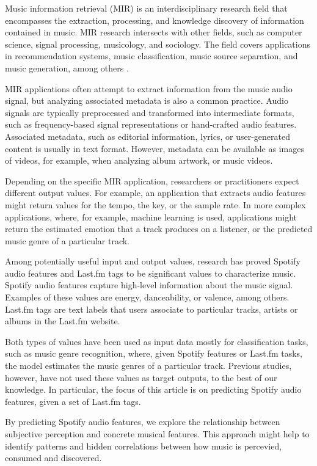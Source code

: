 \documentclass[sn-mathphys]{sn-jnl}%
\theoremstyle{thmstyleone}%
\theoremstyle{thmstyletwo}%
\theoremstyle{thmstylethree}%
\begin{document}
Music information retrieval (MIR) is an interdisciplinary research field that encompasses the extraction,
processing, and knowledge discovery of information contained in music.
MIR research intersects with other fields, such as computer science, signal processing, musicology, and sociology.
The field covers applications in recommendation systems, music classification,
music source separation, and music generation, among others \cite{ramirez2020machine}.

MIR applications often attempt to extract information from the music audio signal,
but analyzing associated metadata is also a common practice.
Audio signals are typically preprocessed and transformed into intermediate formats, such as frequency-based signal representations or hand-crafted audio features.
Associated metadata, such as editorial information, lyrics, or user-generated content is usually in text format.
However, metadata can be available as images of videos, for example, when analyzing album artwork, or music videos.

Depending on the specific MIR application, researchers or practitioners expect different output values.
For example, an application that extracts audio features might return values for the tempo, the key, or the sample rate.
In more complex applications, where, for example, machine learning is used,
applications might return the estimated emotion that a track produces on a listener, or the predicted music genre of a particular track.

Among potentially useful input and output values, research has proved Spotify audio features and Last.fm tags to be significant values to characterize music.
Spotify audio features capture high-level information about the music signal.
Examples of these values are energy, danceability, or valence, among others.
Last.fm tags are text labels that users associate to particular tracks, artists or albums in the Last.fm website.

Both types of values have been used as input data mostly for classification tasks, such as music genre recognition,
where, given Spotify features or Last.fm tasks, the model estimates the music genres of a particular track.
Previous studies, however, have not used these values as target outputs, to the best of our knowledge.
In particular, the focus of this article is on predicting Spotify audio features, given a set of Last.fm tags.

By predicting Spotify audio features, we explore the relationship between subjective perception and concrete musical features.
This approach might help to identify patterns and hidden correlations between how music is percevied, consumed and discovered.
\end{document}
